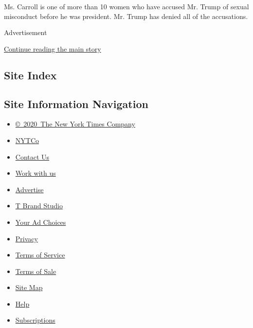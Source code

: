 Ms. Carroll is one of more than 10 women who have accused Mr. Trump of
sexual misconduct before he was president. Mr. Trump has denied all of
the accusations.

Advertisement

\protect\hyperlink{after-bottom}{Continue reading the main story}

\hypertarget{site-index}{%
\subsection{Site Index}\label{site-index}}

\hypertarget{site-information-navigation}{%
\subsection{Site Information
Navigation}\label{site-information-navigation}}

\begin{itemize}
\tightlist
\item
  \href{https://help.nytimes.com/hc/en-us/articles/115014792127-Copyright-notice}{©~2020~The
  New York Times Company}
\end{itemize}

\begin{itemize}
\tightlist
\item
  \href{https://www.nytco.com/}{NYTCo}
\item
  \href{https://help.nytimes.com/hc/en-us/articles/115015385887-Contact-Us}{Contact
  Us}
\item
  \href{https://www.nytco.com/careers/}{Work with us}
\item
  \href{https://nytmediakit.com/}{Advertise}
\item
  \href{http://www.tbrandstudio.com/}{T Brand Studio}
\item
  \href{https://www.nytimes.com/privacy/cookie-policy\#how-do-i-manage-trackers}{Your
  Ad Choices}
\item
  \href{https://www.nytimes.com/privacy}{Privacy}
\item
  \href{https://help.nytimes.com/hc/en-us/articles/115014893428-Terms-of-service}{Terms
  of Service}
\item
  \href{https://help.nytimes.com/hc/en-us/articles/115014893968-Terms-of-sale}{Terms
  of Sale}
\item
  \href{https://spiderbites.nytimes.com}{Site Map}
\item
  \href{https://help.nytimes.com/hc/en-us}{Help}
\item
  \href{https://www.nytimes.com/subscription?campaignId=37WXW}{Subscriptions}
\end{itemize}
